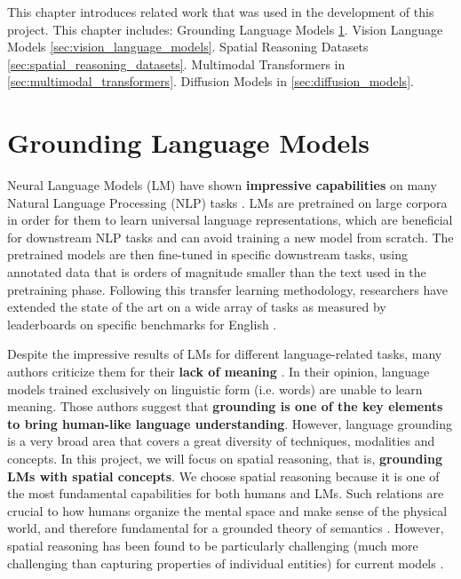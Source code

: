This chapter introduces related work that was used in the development of this project. This chapter includes: Grounding Language Models \cref{sec:grounding_language_models}. Vision Language Models \cref{sec:vision_language_models}. Spatial Reasoning Datasets \cref{sec:spatial_reasoning_datasets}. Multimodal Transformers in \cref{sec:multimodal_transformers}. Diffusion Models in \cref{sec:diffusion_models}.

\section{Grounding Language Models} \label{sec:grounding_language_models}

Neural Language Models (LM) have shown \textbf{impressive capabilities} on many Natural Language Processing (NLP) tasks \cite{wang2019superglue, brown2020language, chowdhery2022palm}. LMs are pretrained on large corpora in order for them to learn universal language representations, which are beneficial for downstream NLP tasks and can avoid training a new model from scratch. The pretrained models are then fine-tuned in specific downstream tasks, using annotated data that is orders of magnitude smaller than the text used in the pretraining phase. Following this transfer learning methodology, researchers have extended the state of the art on a wide array of tasks as measured by leaderboards on specific benchmarks for English \cite{bommasani2021opportunities, wang2019superglue}.

Despite the impressive results of LMs for different language-related tasks, many authors criticize them for their \textbf{lack of meaning} \cite{bender2020climbing, bender2021dangers}. In their opinion, language models trained exclusively on linguistic form (i.e. words) are unable to learn meaning. Those authors suggest that \textbf{grounding is one of the key elements to bring human-like language understanding}. However, language grounding is a very broad area that covers a great diversity of techniques, modalities and concepts. In this project, we will focus on spatial reasoning, that is, \textbf{grounding LMs with spatial concepts}. We choose spatial reasoning because it is one of the most fundamental capabilities for both humans and LMs. Such relations are crucial to how humans organize the mental space and make sense of the physical world, and therefore fundamental for a grounded theory of semantics \cite{levinson2003space}. However, spatial reasoning has been found to be particularly challenging (much more challenging than capturing properties of individual entities) for current models \cite{akula2020words}.


